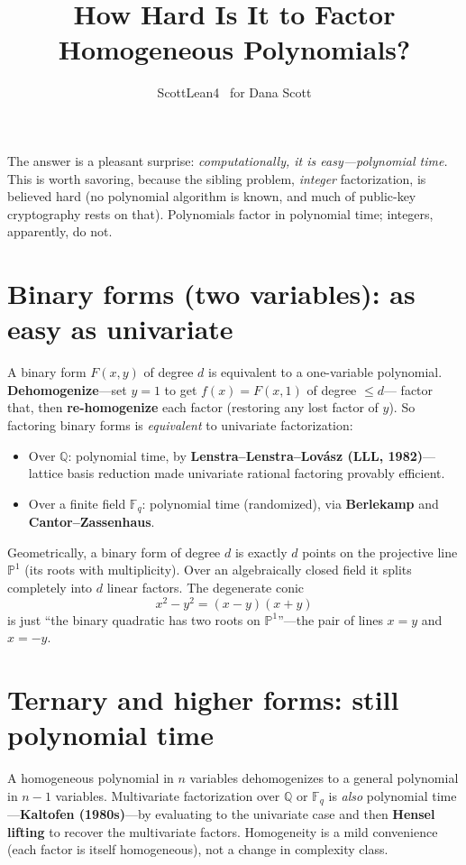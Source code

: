 \documentclass[11pt]{article}
\title{How Hard Is It to Factor Homogeneous Polynomials?}
\author{ScottLean4 \textperiodcentered\ for Dana Scott}
\date{}
\begin{document}
\maketitle

The answer is a pleasant surprise: \emph{computationally, it is easy---polynomial
time.} This is worth savoring, because the sibling problem, \emph{integer}
factorization, is believed hard (no polynomial algorithm is known, and much of
public-key cryptography rests on that). Polynomials factor in polynomial time;
integers, apparently, do not.

\section*{Binary forms (two variables): as easy as univariate}

A binary form $F(x,y)$ of degree $d$ is equivalent to a one-variable polynomial.
\textbf{Dehomogenize}---set $y = 1$ to get $f(x) = F(x,1)$ of degree $\le d$---%
factor that, then \textbf{re-homogenize} each factor (restoring any lost factor
of $y$). So factoring binary forms is \emph{equivalent} to univariate
factorization:
\begin{itemize}
  \item Over $\mathbb{Q}$: polynomial time, by \textbf{Lenstra--Lenstra--Lov\'asz
    (LLL, 1982)}---lattice basis reduction made univariate rational factoring
    provably efficient.
  \item Over a finite field $\mathbb{F}_q$: polynomial time (randomized), via
    \textbf{Berlekamp} and \textbf{Cantor--Zassenhaus}.
\end{itemize}

Geometrically, a binary form of degree $d$ is exactly $d$ points on the
projective line $\mathbb{P}^1$ (its roots with multiplicity). Over an
algebraically closed field it splits completely into $d$ linear factors. The
degenerate conic
\[
  x^2 - y^2 = (x - y)(x + y)
\]
is just ``the binary quadratic has two roots on $\mathbb{P}^1$''---the pair of
lines $x = y$ and $x = -y$.

\section*{Ternary and higher forms: still polynomial time}

A homogeneous polynomial in $n$ variables dehomogenizes to a general polynomial
in $n-1$ variables. Multivariate factorization over $\mathbb{Q}$ or
$\mathbb{F}_q$ is \emph{also} polynomial time---\textbf{Kaltofen (1980s)}---by
evaluating to the univariate case and then \textbf{Hensel lifting} to recover the
multivariate factors. Homogeneity is a mild convenience (each factor is itself
homogeneous), not a change in complexity class.
\end{document}
